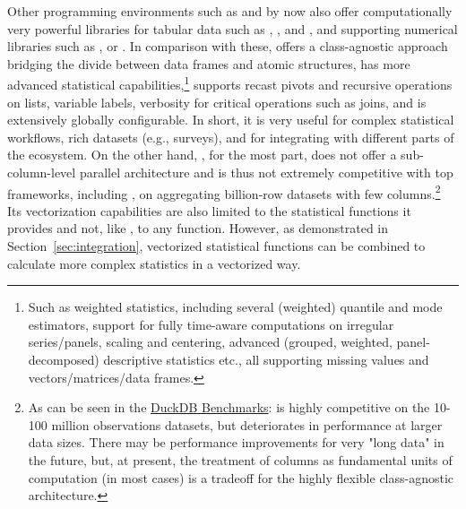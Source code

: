 \documentclass[nojss]{jss} %
\begin{document}
Other programming environments such as  and  by now also offer computationally very powerful libraries for tabular data such as  \citep{jldataframes},  \citep{pypolars}, and  \citep{mckinney2010pandas, pypandas}, and supporting numerical libraries such as  \citep{pynumpy}, or  \citep{jlstatsbase}. %
In comparison with these,  offers a class-agnostic approach bridging the divide between data frames and atomic structures, has more advanced statistical capabilities,\footnote{Such as weighted statistics, including several (weighted) quantile and mode estimators, support for fully time-aware computations on irregular series/panels, scaling and centering, advanced (grouped, weighted, panel-decomposed) descriptive statistics etc., all supporting missing values and vectors/matrices/data frames.} supports recast pivots and recursive operations on lists, variable labels, verbosity for critical operations such as joins, and is extensively globally configurable. In short, it is very useful for complex statistical workflows, rich datasets (e.g., surveys), and for integrating with different parts of the  ecosystem. On the other hand, , for the most part, does not offer a sub-column-level parallel architecture and is thus not extremely competitive with top frameworks, including , on aggregating billion-row datasets with few columns.\footnote{As can be seen in the \href{https://duckdblabs.github.io/db-benchmark/}{DuckDB Benchmarks}:  is highly competitive on the 10-100 million observations datasets, but deteriorates in performance at larger data sizes. There may be performance improvements for very "long data" in the future, but, at present, the treatment of columns as fundamental units of computation (in most cases) is a tradeoff for the highly flexible class-agnostic architecture.} Its vectorization capabilities are also limited to the statistical functions it provides and not, like , to any  function. However, as demonstrated in Section~\ref{sec:integration}, vectorized statistical functions can be combined to calculate more complex statistics in a vectorized way. \newline
\end{document}
